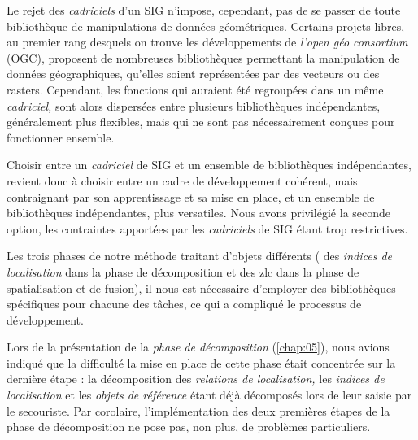 Le rejet des \emph{cadriciels} d'un SIG n'impose, cependant, pas de se
passer de toute bibliothèque de manipulations de données
géométriques. Certains projets libres, au premier rang desquels on
trouve les développements de \emph{l'open géo consortium} (OGC),
proposent de nombreuses bibliothèques permettant la manipulation de
données géographiques, qu'elles soient représentées par des vecteurs
ou des rasters. Cependant, les fonctions qui auraient été regroupées
dans un même \emph{cadriciel,} sont alors dispersées entre plusieurs
bibliothèques indépendantes, généralement plus flexibles, mais qui ne
sont pas nécessairement conçues pour fonctionner ensemble.

Choisir entre un \emph{cadriciel} de SIG et un ensemble de
bibliothèques indépendantes, revient donc à choisir entre un cadre de
développement cohérent, mais contraignant par son apprentissage et sa
mise en place, et un ensemble de bibliothèques indépendantes, plus
versatiles. Nous avons privilégié la seconde option, les contraintes
apportées par les \emph{cadriciels} de SIG étant trop restrictives.

Les trois phases de notre méthode traitant d'objets différents (\ie
des \emph{indices de localisation} dans la phase de décomposition et
des \ac{zlc} dans la phase de spatialisation et de fusion), il nous
est nécessaire d'employer des bibliothèques spécifiques pour chacune
des tâches, ce qui a compliqué le processus de développement.


Lors de la présentation de la \emph{phase de décomposition}
(\autoref{chap:05}), nous avions indiqué que la difficulté la mise en
place de cette phase était concentrée sur la dernière étape : la
décomposition des \emph{relations de localisation,} les \emph{indices
  de localisation} et les \emph{objets de référence} étant déjà
décomposés lors de leur saisie par le secouriste. Par corolaire,
l'implémentation des deux premières étapes de la phase de
décomposition ne pose pas, non plus, de problèmes particuliers.

